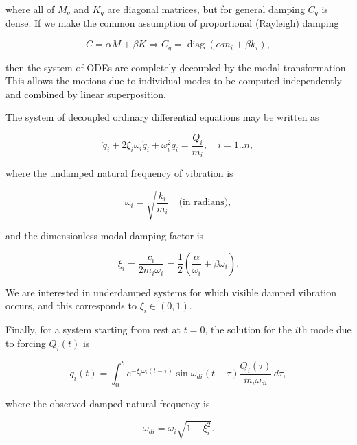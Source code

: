 \documentclass[12pt]{article}
\begin{document}
where all of $M_q$ and $K_q$ are diagonal matrices, but for general damping $C_q$ is dense. If we make the common assumption of proportional (Rayleigh) damping

\begin{equation}
    C = \alpha M + \beta K \Rightarrow C_q = \operatorname{diag}(\alpha m_i + \beta k_i),
\end{equation}

then the system of ODEs are completely decoupled by the modal transformation. This allows the motions due to individual modes to be computed independently and combined by linear superposition.

The system of decoupled ordinary differential equations may be written as

\begin{equation}
    \ddot{q}_i + 2\xi_i \omega_i \dot{q}_i + \omega_i^2 q_i = \frac{Q_i}{m_i}, \quad i = 1..n, \tag{8}
\end{equation}

where the undamped natural frequency of vibration is

\begin{equation}
    \omega_i = \sqrt{\frac{k_i}{m_i}} \quad \text{(in radians)}, \tag{9}
\end{equation}

and the dimensionless modal damping factor is

\begin{equation}
    \xi_i = \frac{c_i}{2m_i\omega_i} = \frac{1}{2} \left(\frac{\alpha}{\omega_i} + \beta\omega_i\right). \tag{10}
\end{equation}

We are interested in underdamped systems for which visible damped vibration occurs, and this corresponds to $\xi_i \in (0, 1)$.

Finally, for a system starting from rest at $t=0$, the solution for the $i$th mode due to forcing $Q_i(t)$ is

\begin{equation}
    q_i(t) = \int_{0}^{t} e^{-\xi_i \omega_i (t-\tau)} \sin \omega_{di} (t- \tau) \frac{Q_i(\tau)}{m_i \omega_{di}} \, d\tau, \tag{11}
\end{equation}

where the observed damped natural frequency is

\begin{equation}
    \omega_{di} = \omega_i \sqrt{1 - \xi_i^2}. \tag{12}
\end{equation}




\end{document}
